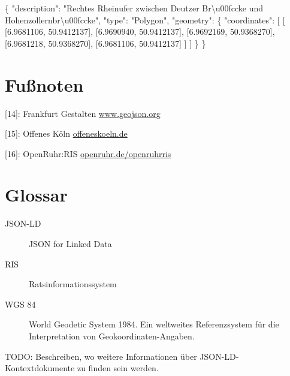 \documentclass[,a4paper]{article}
\newenvironment{Shaded}{}{}
\newcommand{\DataTypeTok}[1]{\textcolor[rgb]{0.56,0.13,0.00}{{#1}}}
\newcommand{\FloatTok}[1]{\textcolor[rgb]{0.25,0.63,0.44}{{#1}}}
\newcommand{\StringTok}[1]{\textcolor[rgb]{0.25,0.44,0.63}{{#1}}}
\newcommand{\NormalTok}[1]{{#1}}
\begin{document}
\begin{Shaded}
\begin{Highlighting}[]
\NormalTok{\{}
    \DataTypeTok{"description"}\NormalTok{: }\StringTok{"Rechtes Rheinufer zwischen Deutzer}
\StringTok{        Br\textbackslash{}u00fccke und Hohenzollernbr\textbackslash{}u00fccke"}\NormalTok{,}
    \DataTypeTok{"type"}\NormalTok{: }\StringTok{"Polygon"}\NormalTok{,}
    \DataTypeTok{"geometry"}\NormalTok{: \{}
        \DataTypeTok{"coordinates"}\NormalTok{: [}
            \NormalTok{[}
                \NormalTok{[}\FloatTok{6.9681106}\NormalTok{, }\FloatTok{50.9412137}\NormalTok{],}
                \NormalTok{[}\FloatTok{6.9690940}\NormalTok{, }\FloatTok{50.9412137}\NormalTok{],}
                \NormalTok{[}\FloatTok{6.9692169}\NormalTok{, }\FloatTok{50.9368270}\NormalTok{],}
                \NormalTok{[}\FloatTok{6.9681218}\NormalTok{, }\FloatTok{50.9368270}\NormalTok{],}
                \NormalTok{[}\FloatTok{6.9681106}\NormalTok{, }\FloatTok{50.9412137}\NormalTok{]}
            \NormalTok{]}
        \NormalTok{]}
    \NormalTok{\}}
\NormalTok{\}}
\end{Highlighting}
\end{Shaded}

\section{Fußnoten}\label{fuuxdfnoten}

{[}14{]}: Frankfurt Gestalten
\href{http://www.geojson.org/}{www.geojson.org}

{[}15{]}: Offenes Köln \href{http://offeneskoeln.de/}{offeneskoeln.de}

{[}16{]}: OpenRuhr:RIS
\href{http://openruhr.de/openruhrris/}{openruhr.de/openruhrris}

\section{Glossar}\label{glossar}

\begin{description}
\item[JSON-LD]
JSON for Linked Data
\item[RIS]
Ratsinformationssystem
\item[WGS 84]
World Geodetic System 1984. Ein weltweites Referenzsystem für die
Interpretation von Geokoordinaten-Angaben.
\end{description}


TODO: Beschreiben, wo weitere Informationen über
JSON-LD-Kontextdokumente zu finden sein werden.
\end{document}
